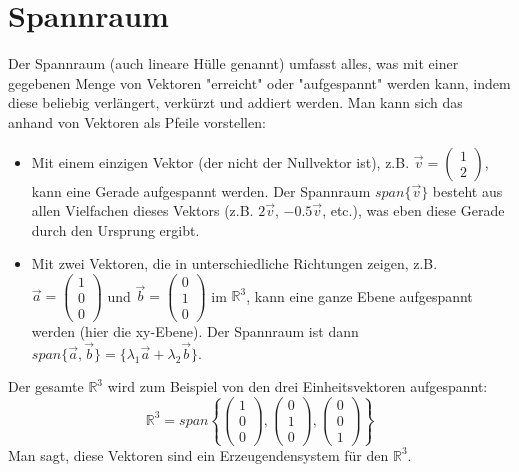 \section{Spannraum}
Der Spannraum (auch lineare Hülle genannt) umfasst alles, was mit einer
gegebenen Menge von Vektoren "erreicht" oder "aufgespannt" werden kann, indem
diese beliebig verlängert, verkürzt und addiert werden. Man kann sich das
anhand von Vektoren als Pfeile vorstellen:
\begin{itemize}
    \item Mit einem einzigen Vektor (der nicht der Nullvektor ist), z.B. \(\vec{v} = \begin{pmatrix} 1 \\ 2 \end{pmatrix}\), kann eine Gerade aufgespannt werden. Der Spannraum \(span\{\vec{v}\}\) besteht aus allen Vielfachen dieses Vektors (z.B. \(2\vec{v}\), \(-0.5\vec{v}\), etc.), was eben diese Gerade durch den Ursprung ergibt.
    \item Mit zwei Vektoren, die in unterschiedliche Richtungen zeigen, z.B. \(\vec{a} = \begin{pmatrix} 1 \\ 0 \\ 0 \end{pmatrix}\) und \(\vec{b} = \begin{pmatrix} 0 \\ 1 \\ 0 \end{pmatrix}\) im \(\mathbb{R}^3\), kann eine ganze Ebene aufgespannt werden (hier die xy-Ebene). Der Spannraum ist dann \(span\{\vec{a}, \vec{b}\} = \{ \lambda_1 \vec{a} + \lambda_2 \vec{b} \}\).
\end{itemize}
Der gesamte \(\mathbb{R}^3\) wird zum Beispiel von den drei Einheitsvektoren aufgespannt:
\[ \mathbb{R}^3 = span \left\{\begin{pmatrix} 1 \\ 0 \\ 0 \end{pmatrix}, \begin{pmatrix} 0 \\ 1 \\ 0 \end{pmatrix}, \begin{pmatrix} 0 \\ 0 \\ 1 \end{pmatrix}\right\} \]
Man sagt, diese Vektoren sind ein Erzeugendensystem für den \(\mathbb{R}^3\).

